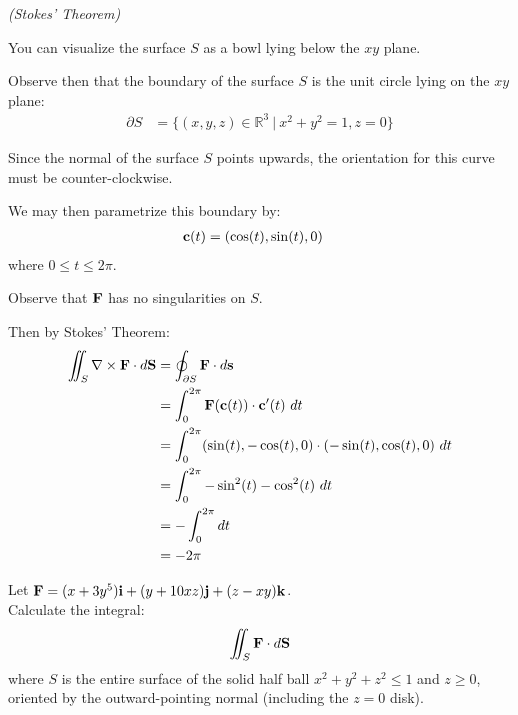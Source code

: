 \begin{solution}
    \textit{(Stokes' Theorem)}

    You can visualize the surface \(S\) as a bowl lying below the \(xy\) plane. 
    
    Observe then that the boundary of the surface \(S\) is the unit circle lying on the \(xy\) plane:
    \begin{align}
        \partial S &= \{(x, y, z) \in \mathbb{R}^3 \ | \ x^2 + y^2 = 1, z = 0\}
    \end{align}

    Since the normal of the surface \(S\) points upwards, the orientation for this curve must be counter-clockwise.

    We may then parametrize this boundary by:
    \begin{align}
        \vb{c}(t) &= (\cos(t), \sin(t), 0)
    \end{align}
    where \(0 \leq t \leq 2\pi\).
    
    Observe that \(\vb{F}\) has no singularities on \(S\).
    
    Then by Stokes' Theorem:
    \begin{align*}
        \iint_S \nabla \times \vb{F} \cdot d \vb{S} &= \oint_{\partial S} \vb{F} \cdot d\vb{s} \\
        &= \int_{0}^{2\pi} \vb{F}(\vb{c}(t)) \cdot \vb{c}'(t) \ dt \\
        &= \int_{0}^{2\pi} (\sin(t), -\cos(t), 0) \cdot (-\sin(t), \cos(t), 0) \ dt \\
        &= \int_{0}^{2\pi} -\sin^2(t) - \cos^2(t) \ dt \\
        &= -\int_{0}^{2\pi} dt \\
        &= -2\pi
    \end{align*}
\end{solution}

\begin{tcolorbox}[
        title={Problem 11},
        valign=center,
        nobeforeafter,
        colframe=gray!95!black
    ]
    Let \(\vb{F} = (x + 3y^5) \vb{i} + (y + 10xz) \vb{j} + (z - xy) \vb{k}\). \\
    
    Calculate the integral:
    \begin{align}
        \iint_S \vb{F} \cdot d\vb{S}
    \end{align}
    where \(S\) is the entire surface of the solid half ball \(x^2 + y^2 + z^2 \leq 1\) and \(z \geq 0\), oriented by the outward-pointing normal (including the \(z = 0\) disk).
\end{tcolorbox}

